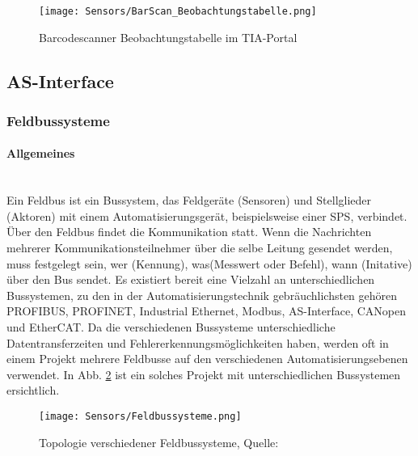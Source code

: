 \begin{figure}[H]
    \centering
    \texttt{[image: Sensors/BarScan\_Beobachtungstabelle.png]}
    \caption{Barcodescanner Beobachtungstabelle im TIA-Portal}
    \label{BarScan_BTabelle}
\end{figure}

\subsection{AS-Interface}
\subsubsection[Feldbussysteme]{Feldbussysteme \cite{Feldbussysteme}} \label{sec:Feldbussysteme}
\paragraph{Allgemeines}\mbox{}\\
Ein Feldbus ist ein Bussystem, das Feldgeräte (Sensoren) und Stellglieder (Aktoren) mit einem Automatisierungsgerät, beispielsweise einer SPS, verbindet. Über den Feldbus findet die Kommunikation statt. Wenn die Nachrichten mehrerer Kommunikationsteilnehmer über die selbe Leitung gesendet werden, muss festgelegt sein, wer (Kennung), was(Messwert oder Befehl), wann (Initative) über den Bus sendet. Es existiert bereit eine Vielzahl an unterschiedlichen Bussystemen, zu den in der Automatisierungstechnik gebräuchlichsten gehören PROFIBUS, PROFINET, Industrial Ethernet, Modbus, AS-Interface, CANopen und EtherCAT. Da die verschiedenen Bussysteme unterschiedliche Datentransferzeiten und Fehlererkennungsmöglichkeiten haben, werden oft in einem Projekt mehrere Feldbusse auf den verschiedenen Automatisierungsebenen verwendet. In Abb. \ref{Feldbussysteme} ist ein solches Projekt mit unterschiedlichen Bussystemen ersichtlich.\\

\begin{figure}[H]
    \centering
    \texttt{[image: Sensors/Feldbussysteme.png]}
    \caption{Topologie verschiedener Feldbussysteme, Quelle: \cite{Topologie_Bussysteme}}
    \label{Feldbussysteme}
\end{figure}


